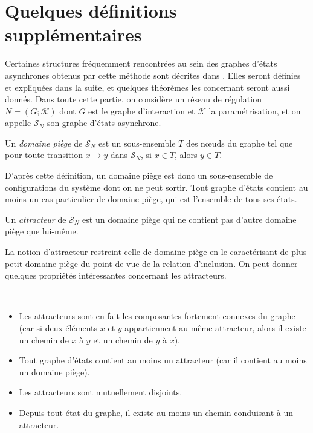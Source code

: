 \section{Quelques définitions supplémentaires}
Certaines structures fréquemment rencontrées au sein des graphes d'états asynchrones obtenus par cette méthode sont décrites dans \cite{richard-comet-bernot-08}. Elles seront définies et expliquées dans la suite, et quelques théorèmes les concernant seront aussi donnés. Dans toute cette partie, on considère un réseau de régulation $N = (G ; \mathcal{K})$ dont $G$ est le graphe d'interaction et $\mathcal{K}$ la paramétrisation, et on appelle $\mathcal{S}_N$ son graphe d'états asynchrone.

\begin{definition}
Un \emph{domaine piège} de $\mathcal{S}_N$ est un sous-ensemble $T$ des n\oe uds du graphe tel que pour toute transition $x \rightarrow y$ dans $\mathcal{S}_N$, si $x \in T$, alors $y \in T$.
\end{definition}
D'après cette définition, un domaine piège est donc un sous-ensemble de configurations du système dont on ne peut sortir. Tout graphe d'états contient au moins un cas particulier de domaine piège, qui est l'ensemble de tous ses états.

\begin{definition}[Attracteur]
Un \emph{attracteur} de $\mathcal{S}_N$ est un domaine piège qui ne contient pas d'autre domaine piège que lui-même.
\end{definition}
La notion d'attracteur restreint celle de domaine piège en le caractérisant de plus petit domaine piège du point de vue de la relation d'inclusion. On peut donner quelques propriétés intéressantes concernant les attracteurs.

\begin{propriete}~
\begin{itemize}
  \item Les attracteurs sont en fait les composantes fortement connexes du graphe (car si deux éléments $x$ et $y$ appartiennent au même attracteur, alors il existe un chemin de $x$ à $y$ et un chemin de $y$ à $x$).
  \item Tout graphe d'états contient au moins un attracteur (car il contient au moins un domaine piège).
  \item Les attracteurs sont mutuellement disjoints.
  \item Depuis tout état du graphe, il existe au moins un chemin conduisant à un attracteur.
\end{itemize}
\end{propriete}

